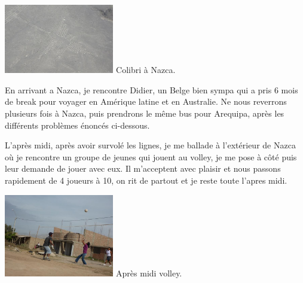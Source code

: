 \begin{multicols}{2}
\hspace*{-0.65cm}
\includegraphics[width=4.8cm]{articles/Cote-du-sud/1255996046TE4T.jpg}
Colibri à Nazca.


En arrivant a Nazca, je rencontre Didier, un Belge bien sympa qui a pris 6 mois de break pour voyager en Amérique latine et en Australie.  Ne nous reverrons plusieurs fois à Nazca, puis prendrons le même bus pour Arequipa, après les différents problèmes énoncés ci-dessous.

L'après midi, après avoir survolé les lignes, je me ballade à l'extérieur de Nazca où je rencontre un groupe de jeunes qui jouent au volley, je me pose à côté puis leur demande de jouer avec eux. Il m'acceptent avec plaisir et nous passons rapidement de 4 joueurs à 10, on rit de partout et je reste toute l'apres midi.

\hspace*{-0.65cm}
\includegraphics[width=4.8cm]{articles/Cote-du-sud/1255996043Enc7.jpg}
Après midi volley.



\end{multicols}
